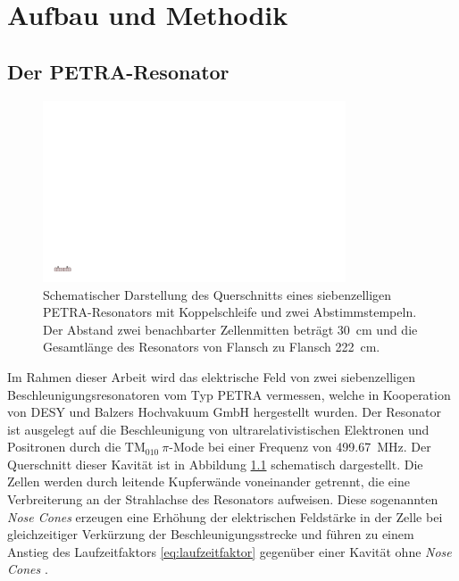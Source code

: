 \chapter{Aufbau und Methodik}
\label{sec:aufbau_und_methodik}

\section{Der PETRA-Resonator}
\label{sec:petra_resonator}
\begin{figure}[htb]
  \centering
  \includegraphics[width=0.8\textwidth]{./figs/cavity/cavity.pdf}
  \caption[Schematische Darstellung des Querschnitts eines siebenzelligen PETRA-Resonators mit Koppelschleife und zwei Abstimmstempeln]{Schematischer Darstellung des Querschnitts eines siebenzelligen PETRA-Resonators mit Koppelschleife und zwei Abstimmstempeln. Der Abstand zwei benachbarter Zellenmitten beträgt \SI{30}{\centi\metre} und die Gesamtlänge des Resonators von Flansch zu Flansch \SI{222}{\centi\metre}.}
  \label{fig:petra_cavity}
\end{figure}
Im Rahmen dieser Arbeit wird das elektrische Feld von zwei siebenzelligen Beschleunigungsresonatoren vom Typ PETRA \cite{desy_petra} vermessen, welche in Kooperation von DESY und Balzers Hochvakuum GmbH hergestellt wurden.
Der Resonator ist ausgelegt auf die Beschleunigung von ultrarelativistischen Elektronen und Positronen durch die $\mathrm{TM}_{010}~\pi$-Mode bei einer Frequenz von \SI{499.67}{MHz}.
Der Querschnitt dieser Kavität ist in Abbildung \ref{fig:petra_cavity} schematisch dargestellt.
Die Zellen werden durch leitende Kupferwände voneinander getrennt, die eine Verbreiterung an der Strahlachse des Resonators aufweisen.
Diese sogenannten \textit{Nose Cones} erzeugen eine Erhöhung der elektrischen Feldstärke in der Zelle bei gleichzeitiger Verkürzung der Beschleunigungsstrecke und führen zu einem Anstieg des Laufzeitfaktors \eqref{eq:laufzeitfaktor} gegenüber einer Kavität ohne \textit{Nose Cones} \cite[S.\ 48]{wangler}.

